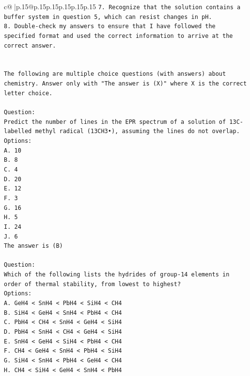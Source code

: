 \documentclass{article}
\begin{document}
{\begin{supertabular}{c@{$\;$}|p{.15\linewidth}@{}p{.15\linewidth}p{.15\linewidth}p{.15\linewidth}p{.15\linewidth}p{.15\linewidth}}
{{{\texttt{7. Recognize that the solution contains a buffer system in question 5, which can resist changes in pH.} \\
\texttt{8. Double{-}check my answers to ensure that I have followed the specified format and used the correct information to arrive at the correct answer.} \\
\\ 
\\ 
\texttt{The following are multiple choice questions (with answers) about chemistry. Answer only with "The answer is (X)" where X is the correct letter choice.} \\
\\ 
\texttt{Question:} \\
\texttt{Predict the number of lines in the EPR spectrum of a solution of 13C{-}labelled methyl radical (13CH3•), assuming the lines do not overlap.} \\
\texttt{Options:} \\
\texttt{A. 10} \\
\texttt{B. 8} \\
\texttt{C. 4} \\
\texttt{D. 20} \\
\texttt{E. 12} \\
\texttt{F. 3} \\
\texttt{G. 16} \\
\texttt{H. 5} \\
\texttt{I. 24} \\
\texttt{J. 6} \\
\texttt{The answer is (B)} \\
\\ 
\texttt{Question:} \\
\texttt{Which of the following lists the hydrides of group{-}14 elements in order of thermal stability, from lowest to highest?} \\
\texttt{Options:} \\
\texttt{A. GeH4 < SnH4 < PbH4 < SiH4 < CH4} \\
\texttt{B. SiH4 < GeH4 < SnH4 < PbH4 < CH4} \\
\texttt{C. PbH4 < CH4 < SnH4 < GeH4 < SiH4} \\
\texttt{D. PbH4 < SnH4 < CH4 < GeH4 < SiH4} \\
\texttt{E. SnH4 < GeH4 < SiH4 < PbH4 < CH4} \\
\texttt{F. CH4 < GeH4 < SnH4 < PbH4 < SiH4} \\
\texttt{G. SiH4 < SnH4 < PbH4 < GeH4 < CH4} \\
\texttt{H. CH4 < SiH4 < GeH4 < SnH4 < PbH4} \\
}}}
\end{supertabular}}
\end{document}
